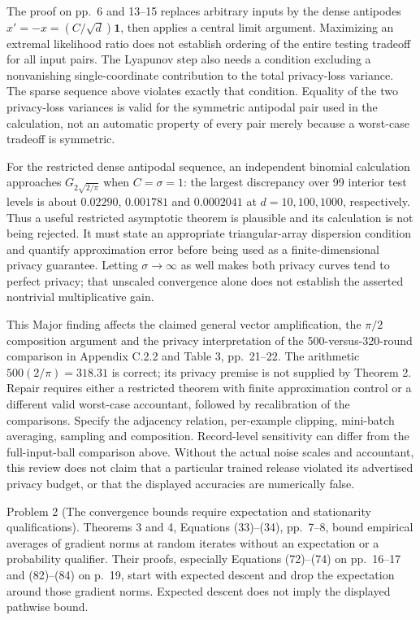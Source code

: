 \documentclass[10pt]{article}
\begin{document}
The proof on pp. 6 and 13–15 replaces arbitrary inputs by the dense antipodes \(x'=-x=(C/\sqrt d)\mathbf1\), then applies a central limit argument. Maximizing an extremal likelihood ratio does not establish ordering of the entire testing tradeoff for all input pairs. The Lyapunov step also needs a condition excluding a nonvanishing single-coordinate contribution to the total privacy-loss variance. The sparse sequence above violates exactly that condition. Equality of the two privacy-loss variances is valid for the symmetric antipodal pair used in the calculation, not an automatic property of every pair merely because a worst-case tradeoff is symmetric.\par
For the restricted dense antipodal sequence, an independent binomial calculation approaches \(G_{2\sqrt{2/\pi}}\) when \(C=\sigma=1\): the largest discrepancy over 99 interior test levels is about \(0.02290\), \(0.001781\) and \(0.0002041\) at \(d=10,100,1000\), respectively. Thus a useful restricted asymptotic theorem is plausible and its calculation is not being rejected. It must state an appropriate triangular-array dispersion condition and quantify approximation error before being used as a finite-dimensional privacy guarantee. Letting \(\sigma\to\infty\) as well makes both privacy curves tend to perfect privacy; that unscaled convergence alone does not establish the asserted nontrivial multiplicative gain.\par
This Major finding affects the claimed general vector amplification, the \(\pi/2\) composition argument and the privacy interpretation of the 500-versus-320-round comparison in Appendix C.2.2 and Table 3, pp. 21–22. The arithmetic \(500(2/\pi)=318.31\) is correct; its privacy premise is not supplied by Theorem 2. Repair requires either a restricted theorem with finite approximation control or a different valid worst-case accountant, followed by recalibration of the comparisons. Specify the adjacency relation, per-example clipping, mini-batch averaging, sampling and composition. Record-level sensitivity can differ from the full-input-ball comparison above. Without the actual noise scales and accountant, this review does not claim that a particular trained release violated its advertised privacy budget, or that the displayed accuracies are numerically false.\par
Problem 2 (The convergence bounds require expectation and stationarity qualifications).  Theorems 3 and 4, Equations (33)–(34), pp. 7–8, bound empirical averages of gradient norms at random iterates without an expectation or a probability qualifier. Their proofs, especially Equations (72)–(74) on pp. 16–17 and (82)–(84) on p. 19, start with expected descent and drop the expectation around those gradient norms. Expected descent does not imply the displayed pathwise bound.\par
\end{document}

